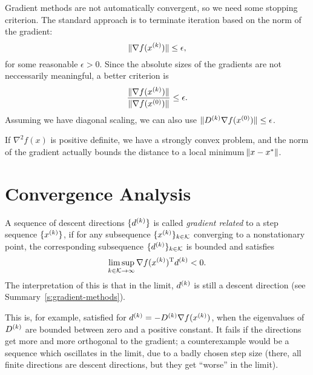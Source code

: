 \documentclass{article}
\begin{document}
\label{s:termination}

Gradient methods are not automatically convergent, so we need some stopping criterion.  The standard
approach is to terminate iteration based on the norm of the gradient:
\begin{equation*}
  \lVert \nabla f(\kth{x}) \rVert \leq \epsilon,
\end{equation*}
for some reasonable \(\epsilon > 0\).  Since the absolute sizes of the gradients are not
neccessarily meaningful, a better criterion is
\begin{equation*}
  \frac{\lVert \nabla f(\kth{x}) \rVert}{\lVert \nabla f(\kth[0]{x}) \rVert} \leq \epsilon.
\end{equation*}
Assuming we have diagonal scaling, we can also use
\(\lVert \kth{D} \nabla f(\kth[0]{x}) \rVert \leq \epsilon\).

If \(\nabla^2 f(x)\) is positive definite, we have a strongly convex problem, and the norm of the
gradient actually bounds the distance to a local minimum \(\enVert{x - x^*}\).


\section{Convergence Analysis}

\label{s:gradient-related-condition}

A sequence of descent directions \(\{\kth{d}\}\) is called \emph{gradient related} to a step
sequence \(\{\kth{x}\}\), if for any subsequence \(\{\kth{x}\}_{k \in \mathcal{K}}\) converging to a
nonstationary point, the corresponding subsequence \(\{\kth{d}\}_{k \in \mathcal{K}}\) is bounded
and satisfies
\begin{equation*}
  \limsup_{k \in \mathcal{K} \to \infty} \T{\nabla f(\kth{x})} \kth{d} < 0.
\end{equation*}
The interpretation of this is that in the limit, \(\kth{d}\) is still a descent direction (see
Summary~\ref{s:gradient-methods}).

This is, for example, satisfied for \(\kth{d} = -\kth{D}\nabla f(\kth{x})\), when the eigenvalues of
\(\kth{D}\) are bounded between zero and a positive constant.  It fails if the directions get more
and more orthogonal to the gradient; a counterexample would be a sequence which oscillates in the
limit, due to a badly chosen step size (there, all finite directions are descent directions, but
they get ``worse'' in the limit).
\end{document}
